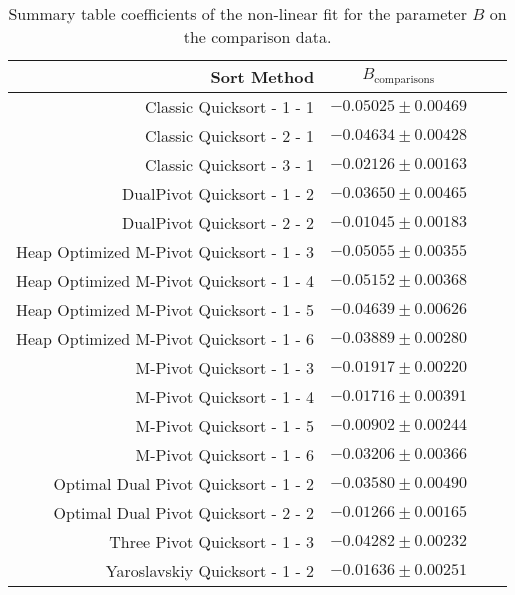 	\begin{table}
		\begin{center}
			\begin{tabular}{|r|c|c|c}
				\hline
								Sort Method              &   $B_{\text{comparisons}}$      \\ \hline \hline
				                Classic Quicksort - 1 - 1 &   $-0.05025 \pm  0.00469$ \\ \hline
				                Classic Quicksort - 2 - 1 &   $-0.04634 \pm  0.00428$ \\ \hline
				                Classic Quicksort - 3 - 1 &   $-0.02126 \pm  0.00163$ \\ \hline
				              DualPivot Quicksort - 1 - 2 &   $-0.03650 \pm  0.00465$ \\ \hline
				              DualPivot Quicksort - 2 - 2 &   $-0.01045 \pm  0.00183$ \\ \hline
				 Heap Optimized M-Pivot Quicksort - 1 - 3 &   $-0.05055 \pm  0.00355$ \\ \hline
				 Heap Optimized M-Pivot Quicksort - 1 - 4 &   $-0.05152 \pm  0.00368$ \\ \hline
				 Heap Optimized M-Pivot Quicksort - 1 - 5 &   $-0.04639 \pm  0.00626$ \\ \hline
				 Heap Optimized M-Pivot Quicksort - 1 - 6 &   $-0.03889 \pm  0.00280$ \\ \hline
				                M-Pivot Quicksort - 1 - 3 &   $-0.01917 \pm  0.00220$ \\ \hline
				                M-Pivot Quicksort - 1 - 4 &   $-0.01716 \pm  0.00391$ \\ \hline
				                M-Pivot Quicksort - 1 - 5 &   $-0.00902 \pm  0.00244$ \\ \hline
				                M-Pivot Quicksort - 1 - 6 &   $-0.03206 \pm  0.00366$ \\ \hline
				     Optimal Dual Pivot Quicksort - 1 - 2 &   $-0.03580 \pm  0.00490$ \\ \hline
				     Optimal Dual Pivot Quicksort - 2 - 2 &   $-0.01266 \pm  0.00165$ \\ \hline
				            Three Pivot Quicksort - 1 - 3 &   $-0.04282 \pm  0.00232$ \\ \hline
				           Yaroslavskiy Quicksort - 1 - 2 &   $-0.01636 \pm  0.00251$ \\ \hline
			\end{tabular}
			\caption{Summary table coefficients of the non-linear fit for the parameter $B$ on the comparison data.}
			\label{tab:compFitCoeffB}
		\end{center}
	\end{table}

